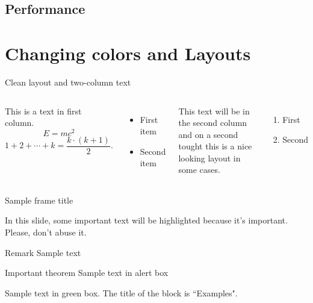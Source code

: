 \documentclass[13pt,aspectratio=169,t,xcolor=table]{beamer}
\begin{document}
\subsection{Performance}

\section{Changing colors and Layouts}


\begin{frame}{Clean layout and two-column text}
    
    \begin{columns}
    
        This is a text in first column.
        $$E=mc^2$$
        $$ 1 + 2 + \cdots + k =  \frac{k \cdot (k + 1)}{2}.$$
        \begin{itemize}
        \item First item
       
        \item Second item
        \end{itemize}
        
        This text will be in the second column
        and on a second tought this is a nice looking
        layout in some cases.
        
        \begin{enumerate}
            \item First
            \item Second
        \end{enumerate}
        
    \end{columns}
    
\end{frame}


\begin{frame}{Sample frame title}
    
    In this slide, some important text will be
    \alert{highlighted} because it's important. Please, don't abuse it.
    
    \begin{block}{Remark}
        Sample text
    \end{block}
    
    \begin{alertblock}{Important theorem}
        Sample text in alert box
    \end{alertblock}
    
    \begin{examples}
        Sample text in green box. The title of the block is ``Examples".
    \end{examples}
    
\end{frame}
\end{document}
